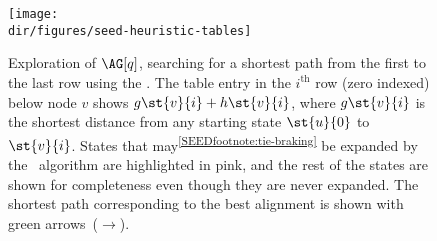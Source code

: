 \begin{figure}[t]
    \centering
	\texttt{[image: \\dir/figures/seed-heuristic-tables]}
	\caption{Exploration of $\AG[q]$, searching for a shortest path from the
	first to the last row using the \seedh. The table entry in the $i^\text{th}$
	row (zero indexed) below node $v$ shows $g\st{v}{i}+h\st{v}{i}$, where
	$g\st{v}{i}$ is the shortest distance from any starting state $\st{u}{0}$ to
	$\st{v}{i}$.
	States that may\textsuperscript{\cref{SEEDfootnote:tie-braking}} be expanded by
	the \A~algorithm are highlighted in \colorbox{pink-highlight}{pink}, and the
	rest of the states are shown for completeness even though they are never
	expanded. The shortest path corresponding to the best alignment is shown
	with green arrows~(\textcolor{dark-green}{$\pmb{\rightarrow}$}).}
	\label{SEEDfig:exploration-table}
\end{figure}
